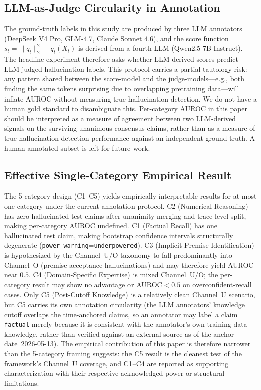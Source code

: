 \documentclass[runningheads]{llncs}
\begin{document}
\subsection{LLM-as-Judge Circularity in Annotation}
\label{ssec:llm-judge-circularity}

The ground-truth labels in this study are produced by three LLM
annotators (DeepSeek V4 Pro, GLM-4.7, Claude Sonnet 4.6), and the
score function $s_t = \|q_t\|_2^2 - q_t(X_t)$ is derived from a
fourth LLM (Qwen2.5-7B-Instruct). The headline experiment therefore
asks whether LLM-derived scores predict LLM-judged hallucination
labels. This protocol carries a partial-tautology risk: any pattern
shared between the score-model and the judge-models---e.g., both
finding the same tokens surprising due to overlapping pretraining
data---will inflate AUROC without measuring true hallucination
detection. We do not have a human gold standard to disambiguate this.
Per-category AUROC in this paper should be interpreted as a measure
of agreement between two LLM-derived signals on the surviving
unanimous-consensus claims, rather than as a measure of true
hallucination detection performance against an independent ground
truth. A human-annotated subset is left for future work.

\subsection{Effective Single-Category Empirical Result}
\label{ssec:effective-single-category}

The 5-category design (C1--C5) yields empirically interpretable
results for at most one category under the current annotation
protocol. C2 (Numerical Reasoning) has zero hallucinated test claims
after unanimity merging and trace-level split, making per-category
AUROC undefined. C1 (Factual Recall) has one hallucinated test
claim, making bootstrap confidence intervals structurally degenerate
(\texttt{power\_warning}=\texttt{underpowered}). C3 (Implicit Premise
Identification) is hypothesized by the Channel~U/O taxonomy to fall
predominantly into Channel~O (premise-acceptance hallucinations) and
may therefore yield AUROC near $0.5$. C4 (Domain-Specific Expertise)
is mixed Channel~U/O; the per-category result may show no advantage
or AUROC$<0.5$ on overconfident-recall cases. Only C5 (Post-Cutoff
Knowledge) is a relatively clean Channel~U scenario, but C5 carries
its own annotation circularity (the LLM annotators' knowledge cutoff
overlaps the time-anchored claims, so an annotator may label a claim
\texttt{factual} merely because it is consistent with the
annotator's own training-data knowledge, rather than verified against
an external source as of the anchor date~2026-05-13). The empirical
contribution of this paper is therefore narrower than the
5-category framing suggests: the C5 result is the cleanest test of
the framework's Channel~U coverage, and C1--C4 are reported as
supporting characterization with their respective acknowledged power
or structural limitations.
\end{document}
